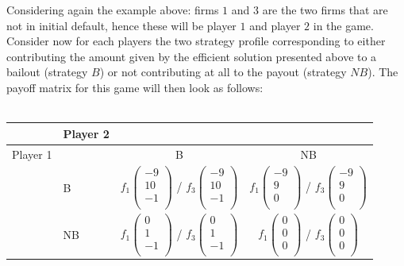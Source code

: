 \documentclass[12pt,a4paper]{article}
\begin{document}
Considering again the example above: firms $1$ and $3$ are the two firms that are not in initial default, hence these will be player $1$ and player $2$ in the game. Consider now for each players the two strategy profile corresponding to either contributing the amount given by the efficient solution presented above to a bailout (strategy $B$) or not contributing at all to the payout (strategy $NB$). The payoff matrix for this game will then look as follows:
\\
\\
\begin{tabular}{|l|l|c|c|}
\hline
 & Player 2 & &  \\ \hline
Player 1 & & B & NB \\ \hline
 & B & $f_1 \begin{pmatrix}
-9 \\
10 \\
-1 \\
\end{pmatrix}$ / $f_3 \begin{pmatrix}
-9 \\
10 \\
-1 \\
\end{pmatrix}$ & $f_1 \begin{pmatrix}
-9 \\
9 \\
0 \\
\end{pmatrix}$ / $f_3 \begin{pmatrix}
-9 \\
9 \\
0 \\ 
\end{pmatrix}$ \\ \hline
 & NB & $f_1 \begin{pmatrix}
0 \\
1 \\
-1 \\
\end{pmatrix}$ / $f_3 \begin{pmatrix}
0 \\
1 \\
-1 \\
\end{pmatrix}$ & $f_1 \begin{pmatrix}
0 \\
0 \\
0 \\
\end{pmatrix}$ / $f_3 \begin{pmatrix}
0 \\
0 \\
0 \\ 
\end{pmatrix}$ \\ \hline
\end{tabular}
\\
\\
\end{document}
